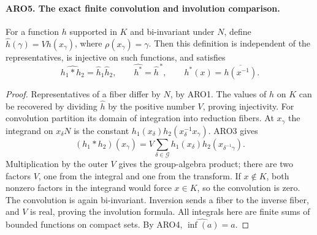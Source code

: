 \documentclass[11pt,a4paper]{article}
\numberwithin{equation}{section}
\theoremstyle{remark}\newtheorem{remark}[theorem]{Remark}
\begin{document}
\paragraph{ARO5. The exact finite convolution and involution comparison.}
\label{claim:ARO5}
For a function \(h\) supported in \(K\) and bi-invariant under
\(N\), define \(\widehat h(\gamma)=Vh(x_\gamma)\), where
\(\rho(x_\gamma)=\gamma\).  Then this definition is independent of
the representatives, is injective on such functions, and satisfies
\[
 \widehat{h_1*h_2}=\widehat h_1\widehat h_2,
 \qquad
 \widehat{h^*}=\widehat h^{\,*},
 \qquad h^*(x)=\overline{h(x^{-1})}.
 \tag{ARO.5}
\]
\begin{proof}
Representatives of a fiber differ by \(N\), by ARO1.
The values of \(h\) on \(K\) can be recovered by dividing
\(\widehat h\) by the positive number \(V\), proving injectivity.
For convolution partition its domain of integration into reduction
fibers.  At \(x_\gamma\) the integrand on \(x_\delta N\) is the
constant \(h_1(x_\delta)h_2(x_\delta^{-1}x_\gamma)\).  ARO3 gives
\[
 (h_1*h_2)(x_\gamma)
 =V\sum_{\delta\in\mathcal G}
           h_1(x_\delta)h_2(x_{\delta^{-1}\gamma}).
\]
Multiplication by the outer \(V\) gives the group-algebra product;
there are two factors \(V\), one from the integral and one from the
transform.  If \(x\notin K\), both nonzero factors in the integrand
would force \(x\in K\), so the convolution is zero.  The convolution
is again bi-invariant.  Inversion sends a fiber to the inverse
fiber, and \(V\) is real, proving the involution formula.  All
integrals here are finite sums of bounded functions on compact sets.
By ARO4, \(\widehat{\operatorname{inf}(a)}=a\).
\end{proof}

\end{document}
